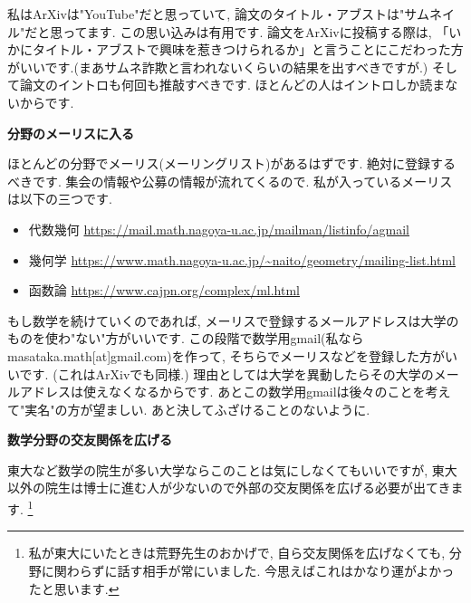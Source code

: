 私はArXivは"YouTube"だと思っていて, 論文のタイトル・アブストは"サムネイル"だと思ってます. この思い込みは有用です. 論文をArXivに投稿する際は, 「いかにタイトル・アブストで興味を惹きつけられるか」と言うことにこだわった方がいいです.(まあサムネ詐欺と言われないくらいの結果を出すべきですが.)
そして論文のイントロも何回も推敲すべきです. ほとんどの人はイントロしか読まないからです. 



\vspace{8pt} 
\textbf{分野のメーリスに入る}  　\vspace{-6pt} 

ほとんどの分野でメーリス(メーリングリスト)があるはずです. 
絶対に登録するべきです. 集会の情報や公募の情報が流れてくるので. 
私が入っているメーリスは以下の三つです.

\begin{itemize}[left=0pt]
  \setlength{\parskip}{0cm} %
  \setlength{\itemsep}{0cm} %
\item 代数幾何 \url{https://mail.math.nagoya-u.ac.jp/mailman/listinfo/agmail}
\item 幾何学 \url{https://www.math.nagoya-u.ac.jp/~naito/geometry/mailing-list.html}
\item 函数論 \url{https://www.cajpn.org/complex/ml.html}
\end{itemize}

もし数学を続けていくのであれば, メーリスで登録するメールアドレスは大学のものを使わ"ない"方がいいです. 
この段階で数学用gmail(私ならmasataka.math[at]gmail.com)を作って, そちらでメーリスなどを登録した方がいいです. (これはArXivでも同様.)
理由としては大学を異動したらその大学のメールアドレスは使えなくなるからです. 
あとこの数学用gmailは後々のことを考えて"実名"の方が望ましい. あと決してふざけることのないように.
\vspace{8pt} 

\textbf{数学分野の交友関係を広げる}  　\vspace{-6pt} 

東大など数学の院生が多い大学ならこのことは気にしなくてもいいですが, 東大以外の院生は博士に進む人が少ないので外部の交友関係を広げる必要が出てきます. \footnote{私が東大にいたときは荒野先生のおかげで, 自ら交友関係を広げなくても, 分野に関わらずに話す相手が常にいました. 今思えばこれはかなり運がよかったと思います.} 

